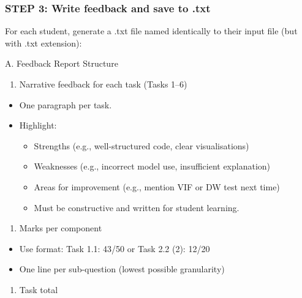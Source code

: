 \documentclass[
  10pt,
]{article}
\providecommand{\tightlist}{%
  \setlength{\itemsep}{0pt}\setlength{\parskip}{0pt}}
\begin{document}
\subsubsection{STEP 3: Write feedback and save to
.txt}\label{step-3-write-feedback-and-save-to-.txt}

For each student, generate a .txt file named identically to their input
file (but with .txt extension):

A. Feedback Report Structure

\begin{enumerate}
\def\labelenumi{\arabic{enumi}.}
\tightlist
\item
  Narrative feedback for each task (Tasks 1--6)
\end{enumerate}

\begin{itemize}
\tightlist
\item
  One paragraph per task.
\item
  Highlight:

  \begin{itemize}
  \tightlist
  \item
    Strengths (e.g., well-structured code, clear visualisations)
  \item
    Weaknesses (e.g., incorrect model use, insufficient explanation)
  \item
    Areas for improvement (e.g., mention VIF or DW test next time)
  \item
    Must be constructive and written for student learning.
  \end{itemize}
\end{itemize}

\begin{enumerate}
\def\labelenumi{\arabic{enumi}.}
\setcounter{enumi}{1}
\tightlist
\item
  Marks per component
\end{enumerate}

\begin{itemize}
\tightlist
\item
  Use format: Task 1.1: 43/50 or Task 2.2 (2): 12/20
\item
  One line per sub-question (lowest possible granularity)
\end{itemize}

\begin{enumerate}
\def\labelenumi{\arabic{enumi}.}
\setcounter{enumi}{2}
\tightlist
\item
  Task total
\end{enumerate}
\end{document}
